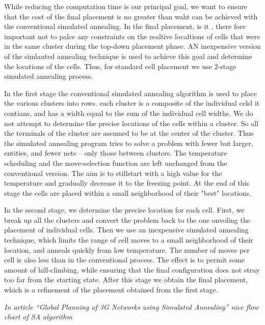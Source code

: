 \documentclass[pdftex,11pt]{article}
\begin{document}
While reducing the computation time is our principal goal, we want to ensure that the cost of the final placement is no greater than waht can be achieved with the conventional simulated annealing. In the final placement, is it , there fore important not to palce any constraints on the realtive localtions of cells that were in the same cluster during the top-down placement phase. AN inexpensive version of the simlauted annealing technique is used to achieve this goal and determine the locations of the cells. Thus, for standard cell placement we use 2-stage simulated annealing process.

In the first stage the conventional simulated annealing algorithm is used to place the various clusters into rows. each cluster is a composite of the individual celsl it contians, and has a width equal to the sum of the individual cell widths. We do not attempt to determine the precise locations of the cells within a cluster. So all the terminals of the cluster are assumed to be at the center of the cluster. Thus the simulated annealing program tries to solve a problem with fewer but larger, entities, and fewer nets -- only those between clusters. The temperature scheduling and the move-selection function are left unchanged from the conventional version. The aim is to stillstart with a high value for the temperature and gradually decrease it to the freezing point. At the end of this stage the cells are placed within a small neighborhood of their "best" locations.

In the second stage, we determine the precise location for each cell. First, we break up all the clusters and convert the problem back to the one onvoling the placement of individual cells. Then we use an inexpensive simulated annealing technique, which limits the range of cell moves to a small neighborhood of their location, and anneals quickly from low temperature. The number of moves per cell is also less than in the conventional process. The effect is to permit some amount of hill-climbing, while ensuring that the final configuration does not stray too far from the starting state. After this stage we obtain the final placement, which is a refinement of the placement obtained from the first stage.

\emph{In article ``Global Planning of 3G Networks using Simulated Annealing'' nice flow chart of SA algorithm}
\end{document}

